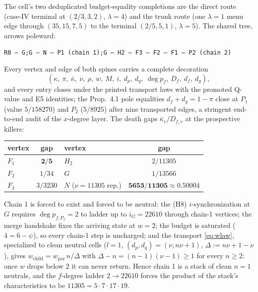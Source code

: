 \documentclass[11pt]{article}
\theoremstyle{definition}
\theoremstyle{remark}
\newcommand{\kb}{\bar\kappa}
\begin{document}
The cell's two deduplicated budget-equality completions are the direct route (case-IV terminal at $(2/3,3,2)$, $\lambda=4$) and the trunk route (one $\lambda=1$ menu edge through $(35,15,7,5)$ to the terminal $(2/5,5,1)$, $\lambda=5$). The shared tree, arrows poleward:
\begin{center}
\texttt{R0 -- G;\quad G -- N -- P1\ (chain 1);\quad G -- H2 -- F3 -- F2 -- F1 -- P2\ (chain 2)}
\end{center}
Every vertex and edge of both spines carries a complete decoration
\[
(\kappa,\ \pi,\ \kb,\ \nu,\ \rho,\ w,\ M,\ i,\ d_p,\ d_q,\ \deg p_f,\ D_f,\ d_f,\ d_g),
\]
and every entry closes under the printed transport laws with the promoted Q-value and E5 identities; the Prop.~4.1 pole equalities $d_f+d_g=1-\pi$ close at $P_1$ (value $5/158270$) and $P_2$ ($5/8925$) after nine transported edges, a stringent end-to-end audit of the $x$-degree layer. The death gaps $\kb_v/D_{f,v}$ at the prospective killers:
\begin{center}
\small
\begin{tabular}{lc@{\qquad}lc}
\toprule
vertex & gap & vertex & gap\\
\midrule
$F_1$ & $\mathbf{2/5}$ & $H_2$ & $2/11305$\\
$F_2$ & $1/34$ & $G$ & $1/13566$\\
$F_3$ & $3/3230$ & $N$ ($\nu=11305$ rep.) & $\mathbf{5653/11305}\approx0.50004$\\
\bottomrule
\end{tabular}
\end{center}
Chain 1 is forced to exist and forced to be neutral: the (H8) $i$-synchronization at $G$ requires $\deg p_{f,P_1}=2$ to ladder up to $i_G=22610$ through chain-1 vertices; the merge handshake fixes the arriving state at $w=2$; the budget is saturated ($4=6-\psi$), so every chain-1 step is uncharged; and the transport \eqref{eq:wlaw}, specialized to clean neutral cells ($l=1$, $(d_p,d_q)=(\nu,n\nu+1)$, $\Delta:=n\nu+1-\nu$), gives $w_{\mathrm{child}}=w_{\mathrm{par}}\,n/\Delta$ with $\Delta-n=(n-1)(\nu-1)\geq1$ for every $n\geq2$: once $w$ drops below $2$ it can never return. Hence chain 1 is a stack of clean $n=1$ neutrals, and the $f$-degree ladder $2\to22610$ forces the product of the stack's characteristics to be $11305=5\cdot7\cdot17\cdot19$.
\end{document}
